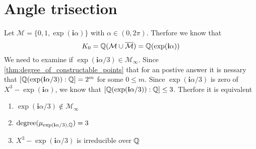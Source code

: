 \documentclass{../Project/TemplateExercise}
\begin{document}
\section{Angle trisection}
Let $\mathcal{M} = \{0,1,\exp(\textbf{i} \alpha)\}$ with $\alpha \in (0,2\pi)$. Therfore we know that
\begin{equation*}
    K_0 = \mathbb{Q}(\mathcal{M}\cup \overline{\mathcal{M}}) = \mathbb{Q}(\exp(\textbf{i} \alpha))
\end{equation*}
We need to examine if $\exp(\textbf{i} \alpha/3) \in \mathcal{M}_{\infty}$. Since \ref{thm:degree_of_constructable_points}
that for an postive answer it is nessary that $[\mathbb{Q}(\exp(\textbf{i} \alpha/3)):\mathbb{Q}] = 2^m$ for some $0 \le m $. \newline
Since $\exp(\textbf{i} \alpha/3)$ is zero of $X^3 - \exp(\textbf{i} \alpha)$, we know that $[\mathbb{Q}(\exp(\textbf{i} \alpha/3)):\mathbb{Q}] \le 3$.
Therfore it is equivalent
\begin{enumerate}
    \item $\exp(\textbf{i} \alpha/3) \notin \mathcal{M}_{\infty}$
    \item $\text{degree}(\mu_{\exp(\textbf{i} \alpha/3),\mathbb{Q}}) = 3$
    \item $X^3 - \exp(\textbf{i} \alpha/3)$ is irreducible over $\mathbb{Q}$
\end{enumerate}
\end{document}
